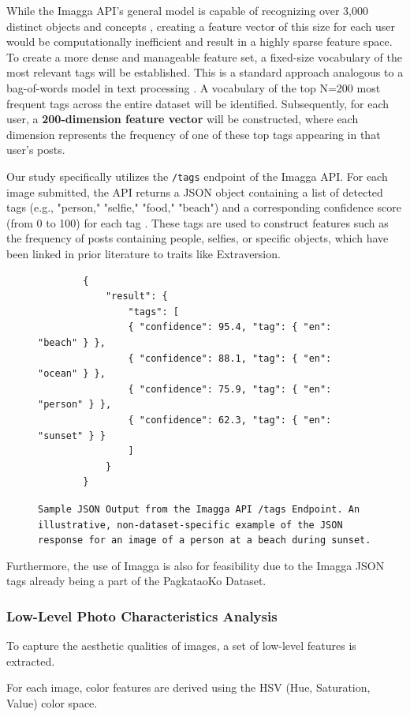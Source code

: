 While the Imagga API's general model is capable of recognizing over 3,000 distinct objects and concepts \citep{imagga_solutions}, creating a feature vector of this size for each user would be computationally inefficient and result in a highly sparse feature space. To create a more dense and manageable feature set, a fixed-size vocabulary of the most relevant tags will be established. This is a standard approach analogous to a bag-of-words model in text processing \citep{salton1975}. A vocabulary of the top N=200 most frequent tags across the entire dataset will be identified. Subsequently, for each user, a \textbf{200-dimension feature vector} will be constructed, where each dimension represents the frequency of one of these top tags appearing in that user's posts.

Our study specifically utilizes the \texttt{/tags} endpoint of the Imagga API. For each image submitted, the API returns a JSON object containing a list of detected tags (e.g., "person," "selfie," "food," "beach") and a corresponding confidence score (from 0 to 100) for each tag \citep{imagga_docs}. These tags are used to construct features such as the frequency of posts containing people, selfies, or specific objects, which have been linked in prior literature to traits like Extraversion.

\begin{figure}[H]
	\centering
	\begin{verbatim}
		{
			"result": {
				"tags": [
				{ "confidence": 95.4, "tag": { "en": "beach" } },
				{ "confidence": 88.1, "tag": { "en": "ocean" } },
				{ "confidence": 75.9, "tag": { "en": "person" } },
				{ "confidence": 62.3, "tag": { "en": "sunset" } }
				]
			}
		}
	\end{verbatim}
	\caption{ \texttt{Sample JSON Output from the Imagga API /tags Endpoint. An illustrative, non-dataset-specific example of the JSON response for an image of a person at a beach during sunset.}}
	\label{fig:imagga_json}
\end{figure}

Furthermore, the use of Imagga is also for feasibility due to the Imagga JSON tags already being a part of the PagkataoKo Dataset.
\subsubsection{Low-Level Photo Characteristics Analysis}
To capture the aesthetic qualities of images, a set of low-level features is extracted.


For each image, color features are derived using the HSV (Hue, Saturation, Value) color space. 

